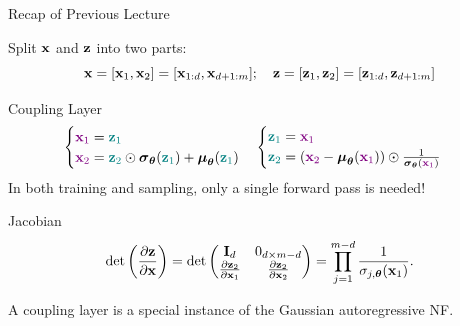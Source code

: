 \documentclass{beamer}
\begin{document}
\begin{frame}{Recap of Previous Lecture}

	Split $\mathbf{x}$ and $\mathbf{z}$ into two parts:
	\[
		\mathbf{x} = [\mathbf{x}_1, \mathbf{x}_2] = [\mathbf{x}_{1:d}, \mathbf{x}_{d+1:m}]; \quad \mathbf{z} = [\mathbf{z}_1, \mathbf{z}_2] = [\mathbf{z}_{1:d}, \mathbf{z}_{d+1:m}]
	\]
	\vspace{-0.7cm}
	\begin{block}{Coupling Layer}
		\vspace{-0.7cm}
		\[
			\begin{cases} {\color{violet}\mathbf{x}_1} = {\color{teal}\mathbf{z}_1} \\ {\color{violet}\mathbf{x}_2} = {\color{teal}\mathbf{z}_2} \odot \boldsymbol{\sigma}_{\boldsymbol{\theta}}({\color{teal}\mathbf{z}_1}) + \boldsymbol{\mu}_{\boldsymbol{\theta}}({\color{teal}\mathbf{z}_1}) \end{cases}
			\begin{cases} {\color{teal}\mathbf{z}_1} ={\color{violet} \mathbf{x}_1} \\ {\color{teal}\mathbf{z}_2} = ({\color{violet}\mathbf{x}_2} - \boldsymbol{\mu}_{\boldsymbol{\theta}}({\color{violet}\mathbf{x}_1})) \odot \frac{1}{\boldsymbol{\sigma}_{\boldsymbol{\theta}}({\color{violet}\mathbf{x}_1})} \end{cases}
		\]
		In both training and sampling, only a single forward pass is needed!
	\end{block}
	\begin{block}{Jacobian}
		\vspace{-0.3cm}
		\[
			\det \left( \frac{\partial \mathbf{z}}{\partial \mathbf{x}} \right) = \det 
			\begin{pmatrix}
				\mathbf{I}_d & 0_{d \times m-d} \\
				\frac{\partial \mathbf{z}_2}{\partial \mathbf{x}_1} & \frac{\partial \mathbf{z}_2}{\partial \mathbf{x}_2}
			\end{pmatrix} = \prod_{j=1}^{m-d} \frac{1}{\sigma_{j, \boldsymbol{\theta}}(\mathbf{x}_1)}.
		\]
	\end{block}
	A coupling layer is a special instance of the Gaussian autoregressive NF.
\end{frame}
\end{document}
